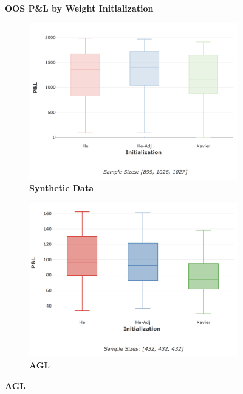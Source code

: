 \documentclass[a4paper,11pt,oneside]{article}
\theoremstyle{plain}
\theoremstyle{definition}
\begin{document}
	
	\begin{figure}[H]
		\centering
		\textbf{OOS P\&L by Weight Initialization}
		\begin{subfigure}{.5\textwidth}
			\centering 
			\includegraphics[scale=0.28]{images/results/newinit/synth_pl_init.png}
			\caption{\textbf{Synthetic Data} 
				\newline }
			\label{figure-synthetic_pl_init}
		\end{subfigure}%
		\begin{subfigure}{.5\textwidth}
			\centering 
			\includegraphics[scale=0.28]{images/results/newinit/agl_pl_init.png}
			\caption{\textbf{AGL} 
				\newline }
			\label{figure-agl_pl_init}
		\end{subfigure}

\end{figure}
\end{document}
